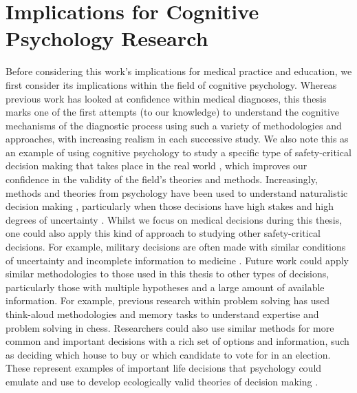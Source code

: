 \documentclass[a4paper, nobind]{templates/ociamthesis}
\begin{document}
\section{Implications for Cognitive Psychology Research}\label{implications-for-cognitive-psychology-research}

Before considering this work's implications for medical practice and education, we first consider its implications within the field of cognitive psychology. Whereas previous work has looked at confidence within medical diagnoses, this thesis marks one of the first attempts (to our knowledge) to understand the cognitive mechanisms of the diagnostic process using such a variety of methodologies and approaches, with increasing realism in each successive study. We also note this as an example of using cognitive psychology to study a specific type of safety-critical decision making that takes place in the real world \autocite{boag_evidence_2023}, which improves our confidence in the validity of the field's theories and methods. Increasingly, methods and theories from psychology have been used to understand naturalistic decision making \autocite{hunt_formalizing_2021}, particularly when those decisions have high stakes and high degrees of uncertainty \autocite{shortland_choice_2020}. Whilst we focus on medical decisions during this thesis, one could also apply this kind of approach to studying other safety-critical decisions. For example, military decisions are often made with similar conditions of uncertainty and incomplete information to medicine \autocite{zhou_information_2020}. Future work could apply similar methodologies to those used in this thesis to other types of decisions, particularly those with multiple hypotheses and a large amount of available information. For example, previous research within problem solving has used think-aloud methodologies \autocite{groot_thought_1978} and memory tasks \autocite{chase_perception_1973} to understand expertise and problem solving in chess. Researchers could also use similar methods for more common and important decisions with a rich set of options and information, such as deciding which house to buy or which candidate to vote for in an election. These represent examples of important life decisions that psychology could emulate and use to develop ecologically valid theories of decision making \autocite{hechtlinger_psychology_2024}.\\
\end{document}
